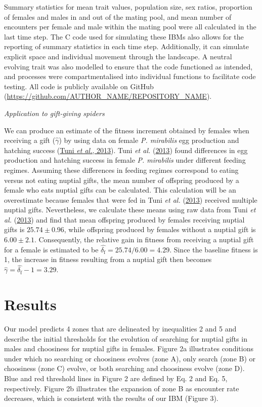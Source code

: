 \documentclass[
]{article}
\begin{document}
Summary statistics for mean trait values, population size, sex ratios,
proportion of females and males in and out of the mating pool, and mean
number of encounters per female and male within the mating pool were all
calculated in the last time step. The C code used for simulating these
IBMs also allows for the reporting of summary statistics in each time
step. Additionally, it can simulate explicit space and individual
movement through the landscape. A neutral evolving trait was also
modelled to ensure that the code functioned as intended, and processes
were compartmentalised into individual functions to facilitate code
testing. All code is publicly available on GitHub
(\url{https://github.com/AUTHOR_NAME/REPOSITORY_NAME}).

\emph{Application to gift-giving spiders}

We can produce an estimate of the fitness increment obtained by females
when receiving a gift (\(\hat{\gamma}\)) by using data on female
\emph{P. mirabilis} egg production and hatching success
(\protect\hyperlink{ref-Tuni2013a}{Tuni \emph{et al.}, 2013}). Tuni
\emph{et al.} (\protect\hyperlink{ref-Tuni2013a}{2013}) found
differences in egg production and hatching success in female \emph{P.
mirabilis} under different feeding regimes. Assuming these differences
in feeding regimes correspond to eating versus not eating nuptial gifts,
the mean number of offspring produced by a female who eats nuptial gifts
can be calculated. This calculation will be an overestimate because
females that were fed in Tuni \emph{et al.}
(\protect\hyperlink{ref-Tuni2013a}{2013}) received multiple nuptial
gifts. Nevertheless, we calculate these means using raw data from Tuni
\emph{et al.} (\protect\hyperlink{ref-Tuni2013a}{2013}) and find that
mean offspring produced by females receiving nuptial gifts is
\(25.74 \pm 0.96\), while offspring produced by females without a
nuptial gift is \(6.00 \pm 2.1\). Consequently, the relative gain in
fitness from receiving a nuptial gift for a female is estimated to be
\(\hat{\delta_\mathrm{f}} = 25.74 / 6.00 = 4.29\). Since the baseline
fitness is 1, the increase in fitness resulting from a nuptial gift then
becomes \(\hat{\gamma} = \hat{\delta_{\mathrm{f}}} - 1 = 3.29.\)

\hypertarget{results}{%
\section{Results}\label{results}}

Our model predicts 4 zones that are delineated by inequalities 2 and 5
and describe the initial thresholds for the evolution of searching for
nuptial gifts in males and choosiness for nuptial gifts in females.
Figure 2a illustrates conditions under which no searching or choosiness
evolves (zone A), only search (zone B) or choosiness (zone C) evolve, or
both searching and choosiness evolve (zone D). Blue and red threshold
lines in Figure 2 are defined by Eq. 2 and Eq. 5, respectively. Figure
2b illustrates the expansion of zone B as encounter rate decreases,
which is consistent with the results of our IBM (Figure 3).
\end{document}
